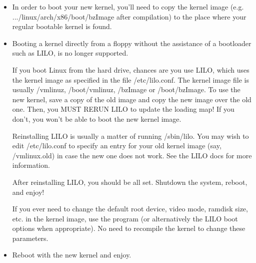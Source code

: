 \documentclass[a4paper,8pt,english]{sphinxmanual}
\begin{document}
\begin{itemize}
\item {} 
In order to boot your new kernel, you'll need to copy the kernel
image (e.g. .../linux/arch/x86/boot/bzImage after compilation)
to the place where your regular bootable kernel is found.

\item {} 
Booting a kernel directly from a floppy without the assistance of a
bootloader such as LILO, is no longer supported.

If you boot Linux from the hard drive, chances are you use LILO, which
uses the kernel image as specified in the file /etc/lilo.conf.  The
kernel image file is usually /vmlinuz, /boot/vmlinuz, /bzImage or
/boot/bzImage.  To use the new kernel, save a copy of the old image
and copy the new image over the old one.  Then, you MUST RERUN LILO
to update the loading map! If you don't, you won't be able to boot
the new kernel image.

Reinstalling LILO is usually a matter of running /sbin/lilo.
You may wish to edit /etc/lilo.conf to specify an entry for your
old kernel image (say, /vmlinux.old) in case the new one does not
work.  See the LILO docs for more information.

After reinstalling LILO, you should be all set.  Shutdown the system,
reboot, and enjoy!

If you ever need to change the default root device, video mode,
ramdisk size, etc.  in the kernel image, use the  program (or
alternatively the LILO boot options when appropriate).  No need to
recompile the kernel to change these parameters.

\item {} 
Reboot with the new kernel and enjoy.

\end{itemize}
\end{document}

